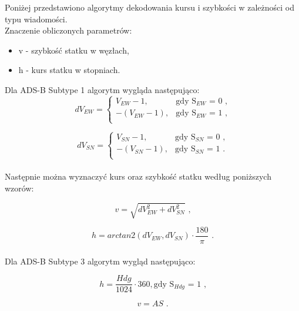 \documentclass[eng,printmode]{mgr}
\begin{document}
Poniżej przedstawiono algorytmy dekodowania kursu i szybkości w zależności od typu wiadomości.
\\

\noindent
Znaczenie obliczonych parametrów:
\begin{itemize}
\item v - szybkość statku w węzłach,
\item h - kurs statku w stopniach.
\end{itemize}

\noindent
Dla ADS-B Subtype 1 algorytm wygląda następująco:
\begin{equation}
\renewcommand*{\arraystretch}{1.3}
dV_{EW}= \left\{ \begin{array}{ll}
V_{EW} - 1, & \textrm{gdy S$_{EW}$ = 0 ,}\\
-(V_{EW} - 1), & \textrm{gdy S$_{EW}$ = 1 ,}\\
\end{array} \right.
\end{equation}

\begin{equation}
\renewcommand*{\arraystretch}{1.3}
dV_{SN}= \left\{ \begin{array}{ll}
V_{SN} - 1, & \textrm{gdy S$_{SN}$ = 0 ,}\\
-(V_{SN} - 1), & \textrm{gdy S$_{SN}$ = 1 .}\\
\end{array} \right.
\end{equation}
\\
\noindent
Następnie można wyznaczyć kurs oraz szybkość statku według poniższych wzorów:

\begin{equation}
v = \sqrt{dV_{EW}^2 + dV_{SN}^2} \textrm{ ,}
\end{equation}

\begin{equation}
h = arctan2(dV_{EW},dV_{SN}) \cdot \frac{180}{\pi} \textrm{ .}
\end{equation}
\\
\noindent
Dla ADS-B Subtype 3 algorytm wygląd następująco:

\begin{equation}
h = \frac{Hdg}{1024} \cdot 360, \textrm{gdy S$_{Hdg}$ = 1} \textrm{ ,}
\end{equation}

\begin{equation}
v = AS \textrm{ .}
\end{equation}
\\
\end{document}
